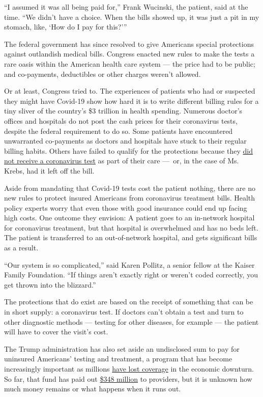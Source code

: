 ``I assumed it was all being paid for,'' Frank Wucinski, the patient,
said at the time. ``We didn't have a choice. When the bills showed up,
it was just a pit in my stomach, like, `How do I pay for this?'''

The federal government has since resolved to give Americans special
protections against outlandish medical bills. Congress enacted new rules
to make the tests a rare oasis within the American health care system
--- the price had to be public; and co-payments, deductibles or other
charges weren't allowed.

Or at least, Congress tried to. The experiences of patients who had or
suspected they might have Covid-19 show how hard it is to write
different billing rules for a tiny sliver of the country's \$3 trillion
in health spending. Numerous doctor's offices and hospitals do not post
the cash prices for their coronavirus tests, despite the federal
requirement to do so. Some patients have encountered unwarranted
co-payments as doctors and hospitals have stuck to their regular billing
habits. Others have failed to qualify for the protections because they
\href{https://khn.org/news/bill-of-the-month-covid19-tests-are-free-except-when-theyre-not/}{did
not receive a coronavirus test} as part of their care ---~or, in the
case of Ms. Krebs, had it left off the bill.

Aside from mandating that Covid-19 tests cost the patient nothing, there
are no new rules to protect insured Americans from coronavirus treatment
bills. Health policy experts worry that even those with good insurance
could end up facing high costs. One outcome they envision: A patient
goes to an in-network hospital for coronavirus treatment, but that
hospital is overwhelmed and has no beds left. The patient is transferred
to an out-of-network hospital, and gets significant bills as a result.

``Our system is so complicated,'' said Karen Pollitz, a senior fellow at
the Kaiser Family Foundation. ``If things aren't exactly right or
weren't coded correctly, you get thrown into the blizzard.''

The protections that do exist are based on the receipt of something that
can be in short supply: a coronavirus test. If doctors can't obtain a
test and turn to other diagnostic methods --- testing for other
diseases, for example --- the patient will have to cover the visit's
cost.

The Trump administration has also set aside an undisclosed sum to pay
for uninsured Americans' testing and treatment, a program that has
become increasingly important as millions
\href{https://www.nytimes3xbfgragh.onion/2020/07/13/us/politics/coronavirus-health-insurance-trump.html}{have
lost coverage} in the economic downturn. So far, that fund has paid out
\href{https://data.cdc.gov/Administrative/Claims-Reimbursement-to-Health-Care-Providers-and-/rksx-33p3}{\$348
million} to providers, but it is unknown how much money remains or what
happens when it runs out.

